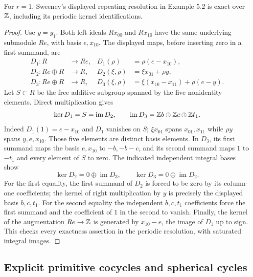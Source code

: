 \begin{proposition}
\label{prop:Mr-Sweeney-resolution}
For $r=1$, Sweeney's displayed repeating resolution in Example 5.2 is
exact over $\mathbb Z$, including its periodic kernel identifications.
\end{proposition}
\begin{proof}
Use $y=y_1$.  Both left ideals $Rx_{00}$ and $Rx_{10}$ have the same
underlying submodule $Re$, with basis $e,x_{10}$.  The displayed maps,
before inserting zero in a first summand, are
\[
 \begin{aligned}
 D_1:R&\longrightarrow Re,& D_1(\rho)&=\rho(e-x_{10}),\\
 D_2:Re\oplus R&\longrightarrow R,&
 D_2(\xi,\rho)&=\xi x_{01}+\rho y,\\
 D_3:Re\oplus R&\longrightarrow R,&
 D_3(\xi,\rho)&=\xi(x_{10}-x_{11})+\rho(e-y).
 \end{aligned}
\]
Let $S\subset R$ be the free additive subgroup spanned by the five
nonidentity elements.  Direct multiplication gives
\[
 \ker D_1=S=\operatorname{im}D_2,
 \qquad \operatorname{im}D_3=\mathbb Z b\oplus\mathbb Z c\oplus\mathbb Z t_1.
\]
Indeed $D_1(1)=e-x_{10}$ and $D_1$ vanishes on $S$;
$\xi x_{01}$ spans $x_{01},x_{11}$ while $\rho y$ spans $y,e,x_{10}$.
Those five elements are distinct basis elements.  In $D_3$, its first
summand maps the basis $e,x_{10}$ to $-b,-b-c$, and its second summand
maps $1$ to $-t_1$ and every element of $S$ to zero.
The indicated independent integral bases show
\[
 \ker D_2=0\oplus\operatorname{im}D_3,
 \qquad \ker D_3=0\oplus\operatorname{im}D_2.
\]
For the first equality, the first summand of $D_2$ is forced to be
zero by its column-one coefficients; the kernel of right
multiplication by $y$ is precisely the displayed basis $b,c,t_1$.
For the second equality the independent $b,c,t_1$ coefficients force
the first summand and the coefficient of $1$ in the second to vanish.
Finally, the kernel of the augmentation $Re\to\mathbb Z$ is generated by
$x_{10}-e$, the image of $D_1$ up to sign.  This checks every exactness
assertion in the periodic resolution, with saturated integral images.
\end{proof}

\subsection{Explicit primitive cocycles and spherical cycles}

